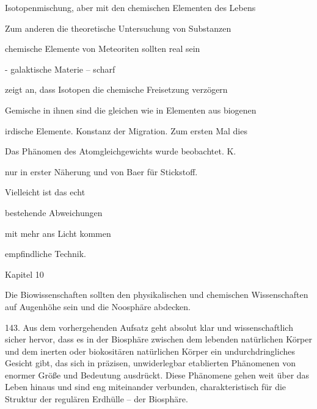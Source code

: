 \documentclass[11pt,a4paper]{book}
\begin{document}
Isotopenmischung, aber mit den chemischen Elementen des Lebens



Zum anderen die theoretische Untersuchung von Substanzen



chemische Elemente von Meteoriten sollten real sein



- galaktische Materie -- scharf



zeigt an, dass Isotopen die chemische Freisetzung verzögern



Gemische in ihnen sind die gleichen wie in Elementen aus biogenen



irdische Elemente. Konstanz der Migration. Zum ersten Mal dies



Das Phänomen des Atomgleichgewichts wurde beobachtet. K.



nur in erster Näherung und von Baer für Stickstoff.



Vielleicht ist das echt



bestehende Abweichungen



mit mehr ans Licht kommen



empfindliche Technik.



 



Kapitel 10



 



Die Biowissenschaften sollten den physikalischen und chemischen Wissenschaften auf Augenhöhe sein und die Noosphäre abdecken.



 





143. Aus dem vorhergehenden Aufsatz geht absolut klar und wissenschaftlich sicher hervor, dass es in der Biosphäre zwischen dem lebenden natürlichen Körper und dem inerten oder biokositären natürlichen Körper ein undurchdringliches Gesicht gibt, das sich in präzisen, unwiderlegbar etablierten Phänomenen von enormer Größe und Bedeutung ausdrückt. Diese Phänomene gehen weit über das Leben hinaus und sind eng miteinander verbunden, charakteristisch für die Struktur der regulären Erdhülle -- der Biosphäre.
\end{document}
